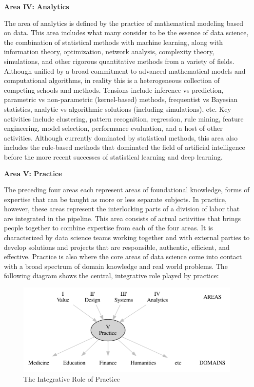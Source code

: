 \documentclass[
  letterpaper,
]{report}
\begin{document}
\textbf{Area IV: Analytics}

The area of analytics is defined by the practice of mathematical
modeling based on data. This area includes what many consider to be the
essence of data science, the combination of statistical methods with
machine learning, along with information theory, optimization, network
analysis, complexity theory, simulations, and other rigorous
quantitative methods from a variety of fields. Although unified by a
broad commitment to advanced mathematical models and computational
algorithms, in reality this is a heterogeneous collection of competing
schools and methods. Tensions include inference vs prediction,
parametric vs non-parametric (kernel-based) methods, frequentist vs
Bayesian statistics, analytic vs algorithmic solutions (including
simulations), etc. Key activities include clustering, pattern
recognition, regression, rule mining, feature engineering, model
selection, performance evaluation, and a host of other activities.
Although currently dominated by statistical methods, this area also
includes the rule-based methods that dominated the field of artificial
intelligence before the more recent successes of statistical learning
and deep learning.

\textbf{Area V: Practice}

The preceding four areas each represent areas of foundational knowledge,
forms of expertise that can be taught as more or less separate subjects.
In practice, however, these areas represent the interlocking parts of a
division of labor that are integrated in the pipeline. This area
consists of actual activities that brings people together to combine
expertise from each of the four areas. It is characterized by data
science teams working together and with external parties to develop
solutions and projects that are responsible, authentic, efficient, and
effective. Practice is also where the core areas of data science come
into contact with a broad spectrum of domain knowledge and real world
problems. The following diagram shows the central, integrative role
played by practice:

\begin{figure}

{\centering \includegraphics{chapters/02_Structure/images/image3.png}

}

\caption{The Integrative Role of Practice}

\end{figure}
\end{document}
